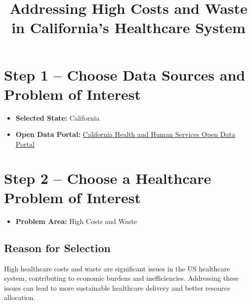 \documentclass{article}
\title{Addressing High Costs and Waste in California's Healthcare System}
\author{}
\date{}
\begin{document}
\maketitle

\section*{Step 1 – Choose Data Sources and Problem of Interest}
\begin{itemize}
    \item \textbf{Selected State:} California
    \item \textbf{Open Data Portal:} \href{https://data.chhs.ca.gov/group/healthcare}{California Health and Human Services Open Data Portal}
\end{itemize}

\section*{Step 2 – Choose a Healthcare Problem of Interest}
\begin{itemize}
    \item \textbf{Problem Area:} High Costs and Waste
\end{itemize}

\subsection*{Reason for Selection}
High healthcare costs and waste are significant issues in the US healthcare system, contributing to economic burdens and inefficiencies. Addressing these issues can lead to more sustainable healthcare delivery and better resource allocation.
\end{document}
